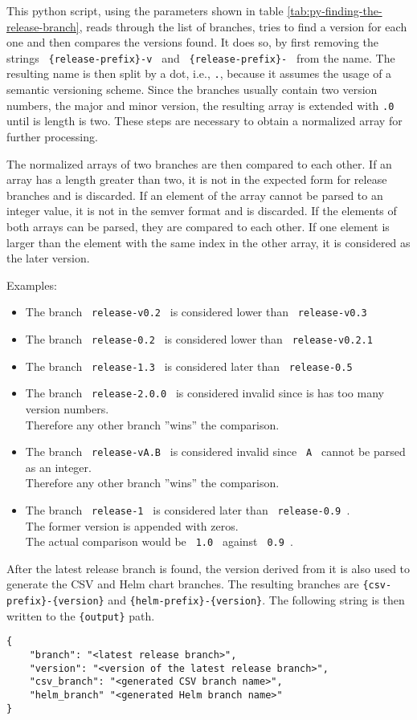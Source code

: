 This python script, using the parameters shown in table \ref{tab:py-finding-the-release-branch}, reads through the list of branches, tries to find a version for each one and then compares the versions found.
It does so, by first removing the strings \verb| {release-prefix}-v | and \verb| {release-prefix}- | from the name.
The resulting name is then split by a dot, i.e., \verb|.|, because it assumes the usage of a semantic versioning scheme.
Since the branches usually contain two version numbers, the major and minor version, the resulting array is extended with \verb|.0| until is length is two.
These steps are necessary to obtain a normalized array for further processing.

The normalized arrays of two branches are then compared to each other.
If an array has a length greater than two, it is not in the expected form for release branches and is discarded.
If an element of the array cannot be parsed to an integer value, it is not in the semver format and is discarded.
If the elements of both arrays can be parsed, they are compared to each other.
If one element is larger than the element with the same index in the other array, it is considered as the later version.

\pagebreak

Examples:
\begin{itemize}
    \item The branch \verb| release-v0.2 | is considered lower than \verb| release-v0.3 |
    \item The branch \verb| release-0.2 |  is considered lower than \verb| release-v0.2.1 |
    \item The branch \verb| release-1.3 | is considered later than \verb| release-0.5 |
    \item The branch \verb| release-2.0.0 | is considered invalid since is has too many version numbers. \\ Therefore any other branch ''wins'' the comparison.
    \item The branch \verb| release-vA.B | is considered invalid since \verb| A | cannot be parsed as an integer. \\ Therefore any other branch ''wins'' the comparison.
    \item The branch \verb| release-1 | is considered later than \verb| release-0.9 |. \\ The former version is appended with zeros. \\ The actual comparison would be \verb| 1.0 | against \verb| 0.9 |.
\end{itemize}

After the latest release branch is found, the version derived from it is also used to generate the CSV and Helm chart branches.
The resulting branches are \verb`{csv-prefix}-{version}` and \verb`{helm-prefix}-{version}`.
The following string is then written to the \verb`{output}` path.

\begin{verbatim}
{
    "branch": "<latest release branch>",
    "version": "<version of the latest release branch>",
    "csv_branch": "<generated CSV branch name>",
    "helm_branch" "<generated Helm branch name>"
}
\end{verbatim}
